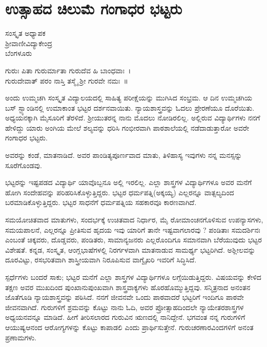 {\fontsize{14}{16}\selectfont
\chapter{ಉತ್ಸಾಹದ ಚಿಲುಮೆ ಗಂಗಾಧರ ಭಟ್ಟರು}

\begin{center}
\smallskip
ಸಂಸ್ಕೃತ ಅಧ್ಯಾಪಕ\\
ಶ್ರೀವಾಣೀವಿದ್ಯಾಕೇಂದ್ರ\\
ಬೆಂಗಳೂರು
\addrule
\end{center}
\begin{center}
ಗುರುಃ ಪಿತಾ ಗುರುರ್ಮಾತಾ ಗುರುದೆವ ಹಿ ಬಾಂಧವಾಃ~।\\
ಗುರುದೇವಾತ್ ಪರಂ ನಾಸ್ತಿ ತಸ್ಮೈ ಶ್ರೀ ಗುರವೇ ನಮಃ~॥
\end{center}
ಅಂದು ಉಮ್ಮಚಗಿ ಸಂಸ್ಕೃತ ವಿದ್ಯಾಲಯದಲ್ಲಿ ಸಾಹಿತ್ಯ ಪರೀಕ್ಷೆಯನ್ನು ಮುಗಿಸಿದ ಸಂಭ್ರಮ. ಆ ದಿನ ಉಮ್ಮಚಗಿಯ ಬಸ್ ಸ್ಟ್ಯಾಂಡಿನಲ್ಲಿ ಉಮಾಕಾಂತ ಭಟ್ಟರ ದರ್ಶನವಾಯಿತು. ನ್ಯಾಯಶಾಸ್ತ್ರವನ್ನು ಓದಲು ಪ್ರೇರಣೆಯೂ ದೊರೆಯಿತು. ಅಧ್ಯಯನಕ್ಕಾಗಿ ಮೈಸೂರಿಗೆ ತೆರಳಿದೆ. ಶ್ರೀಯುತರನ್ನ ನಾನು ಮೊದಲು ನೋಡಿರಲಿಲ್ಲ. ಅಲ್ಲಿರುವ ವಿದ್ಯಾರ್ಥಿಗಳು ನನಗೆ ಹೇಳಿದ್ದು  \enginline{-}   ಯಾರು ಅಂಗಿಯ ಮೇಲೆ ಶಲ್ಯವನ್ನು ಧರಿಸಿ ಗಂಭೀರವಾಗಿ ಪಾಠಶಾಲೆಯಲ್ಲಿ ನಡೆದಾಡುತ್ತಾರೋ ಅವರೇ ಗಂಗಾಧರ ಭಟ್ಟರು.

ಅವರನ್ನು ಕಂಡೆ, ಮಾತನಾಡಿದೆ. ಅವರ ಪಾಂಡಿತ್ಯಪೂರ್ಣವಾದ ಮಾತು, ತಿಳಿಹಾಸ್ಯ ಇವುಗಳು ನನ್ನ ಮನಸ್ಸನ್ನು ಸೂರೆಗೊಂಡವು.

ಭಟ್ಟರನ್ನು ಇಷ್ಟಪಡದ ವಿದ್ಯಾರ್ಥಿ ಯಾವೊಬ್ಬನೂ ಅಲ್ಲಿ ಇರಲಿಲ್ಲ. ಎಲ್ಲಾ ಶಾಸ್ತ್ರಗಳ ವಿದ್ಯಾರ್ಥಿಗಳೂ ಅವರ ಮನೆಗೆ ಹೋಗಿ ಸಂದೇಹವನ್ನು ಪರಿಹರಿಸಿಕೊಳ್ಳುತ್ತಿದ್ದರು. ಭಟ್ಟರ ಧರ್ಮಪತ್ನಿ(ಅಕ್ಕಯ್ಯ) ಎಲ್ಲರನ್ನೂ ವಾತ್ಸಲ್ಯದಿಂದ ಬರಮಾಡಿಕೊಳ್ಳುತ್ತಿದ್ದರು. ಭಟ್ಟರ ಸಾಧನೆಗೆ ಧರ್ಮಪತ್ನಿಯ ಸಹಕಾರವೂ ಕಾರಣವಾಗಿದೆ.

ಸಮಯೋಚಿತವಾದ ಮಾತುಗಳು, ಸಂದರ್ಭಕ್ಕೆ ಉಚಿತವಾದ ನಿರ್ಧಾರ, ಮೈ ರೋಮಾಂಚನಗೊಳಿಸುವ ಉಪನ್ಯಾಸಗಳು, ಸಮಯಪಾಲನೆ, ಎಲ್ಲರನ್ನೂ ಪ್ರೀತಿಸುವ ಹೃದಯ ಇವು ಯಾರಿಗೆ ತಾನೇ ಇಷ್ಟವಾಗಲಾರವು ? ಪಂಡಿತಾಃ ಸಮದರ್ಶಿನಃ ಎಂಬಂತೆ ಚಿಕ್ಕವರು, ದೊಡ್ಡವರು, ಪಂಡಿತರು, ಸಾಮಾನ್ಯಜನರು ಎಲ್ಲರೊಂದಿಗೂ ಸಮಾನವಾಗಿ ಬೆರೆಯುವುದು ಭಟ್ಟರ ವಿಶೇಷತೆ. ಕನ್ನಡ, ಸಂಸ್ಕೃತ, ಆಂಗ್ಲಭಾಷೆಗಳಲ್ಲಿ ನಿರರ್ಗಳವಾಗಿ ಮಾತನಾಡುವ ಸಾಮರ್ಥ್ಯ ಭಟ್ಟರಿಗಿದೆ. ಅಶ್ಲೀಲವನ್ನು ದೂರವಿಟ್ಟು, ರಸಭರಿತವಾಗಿ ಶಾಸ್ತ್ರೀಯವಾಗಿ ನಿರೂಪಿಸುವ ವಾಗ್ವೈಖರಿ ಇವರಿಗೆ ಸಿದ್ಧಿಸಿದೆ.

ಸ್ಪರ್ಧೆಗಳು ಬಂದರೆ ಸಾಕು; ಭಟ್ಟರ ಮನೆಗೆ ಎಲ್ಲಾ ಶಾಸ್ತ್ರಗಳ ವಿದ್ಯಾರ್ಥಿಗಳೂ ಲಗ್ಗೆಯಿಡುತ್ತಿದ್ದರು. ವಿಷಯವನ್ನು ಕೇಳಿದ ತಕ್ಷಣ ಅವರ ಮುಖದಿಂದ ಪುಂಖಾನುಪುಂಖವಾಗಿ ಶಾಸ್ತ್ರವಾಕ್ಯಗಳು ಹೊರಹೊಮ್ಮುತ್ತಿದ್ದವು. ಸನ್ಮಿತ್ರನಾದ ಅನಂತನ ಜೊತೆಗೂಡಿ ನ್ಯಾಯಶಾಸ್ತ್ರವನ್ನು ಪಠಿಸಿದೆ. ನನಗೆ ಜೀವನವೇ ಒಂದು ಪಾಠವಾದರೆ ಭಟ್ಟರಿಗೆ ಇಂದಿಗೂ ಪಾಠವೇ ಜೀವನವಾಗಿದೆ. ಗುರುಗಳಿಗೆ ಶ್ರಮವನ್ನು ಕೊಟ್ಟು ನಾನು ಓದಿ, ಅವರ ಪ್ರೋತ್ಸಾಹದಿಂದಲೇ ನ್ಯಾಯೇತರಶಾಸ್ತ್ರಗಳ ಅಧ್ಯಯನವನ್ನೂ ಮಾಡಿದೆ. ಹೀಗೆ ತೀರಿಸಲಾರದ ಗುರುವಿನ ಋಣದಲ್ಲಿ ನಾನಿದ್ದೇನೆ. ಭಗವಂತ ನನ್ನ ಗುರುಗಳಿಗೆ ಆಯುಷ್ಯಆನಂದ ಆರೋಗ್ಯಗಳನ್ನು ಕೊಟ್ಟು ಕಾಪಾಡಲಿ ಎಂದು ಪ್ರಾರ್ಥಿಸುತ್ತೇನೆ. ಗುರುಚರಣಾರವಿಂದಗಳಿಗೆ ಅನಂತ ಪ್ರಣಾಮಗಳು.

\articleend	
}
